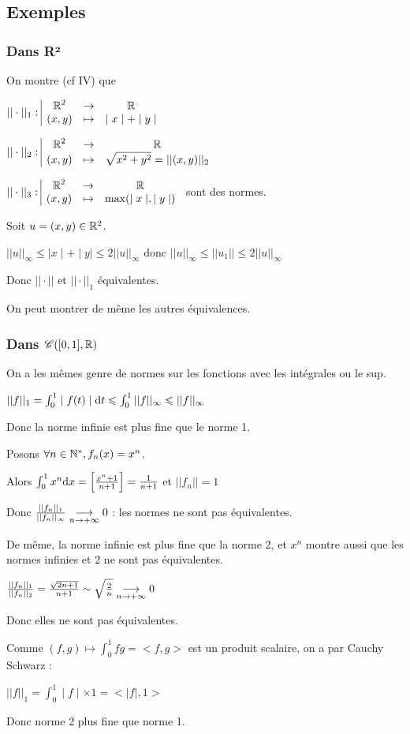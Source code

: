 \subsection{Exemples}

\subsubsection{Dans R²}

\begin{exemple}
    On montre (cf IV) que 

    $|| \cdot ||_1: \space \begin{array}{|ccc} \displaystyle \mathbb{R}^2 & \to & \displaystyle \mathbb{R} \\ \displaystyle (x, y) & \mapsto & \displaystyle \mid x \mid + \mid y \mid \end{array}$

    $|| \cdot ||_2: \space \begin{array}{|ccc} \displaystyle \mathbb{R}^2 & \to & \displaystyle \mathbb{R} \\ \displaystyle (x, y) & \mapsto & \displaystyle \sqrt{x^2 + y^2} = ||(x, y)||_2 \end{array}$

    $|| \cdot ||_3: \space \begin{array}{|ccc} \displaystyle \mathbb{R}^2 & \to & \displaystyle \mathbb{R} \\ \displaystyle (x, y) & \mapsto & \displaystyle \max (\mid x \mid, \mid y \mid) \end{array}$
    sont des normes.

    Soit $u = (x, y) \in \mathbb{R}^2$. 

    $|| u ||_\infty \leqslant \mid x \mid + \mid y \mid \leqslant 2 ||u||_\infty$
    donc $|| u ||_\infty \leqslant ||u_1|| \leqslant 2 ||u||_\infty$

    Donc $|| \cdot ||$ et $|| \cdot ||_1$ équivalentes. 

    On peut montrer de même les autres équivalences.
\end{exemple}

\subsubsection{Dans \texorpdfstring{$\mathscr C([0, 1], \mathbb{R})$}{C([0, 1], R)}}

\begin{exemple}
    On a les mêmes genre de normes sur les fonctions avec les intégrales ou le sup. 

    $|| f ||_1 = \int_{0}^{1} \mid f(t) \mid \text d t \leqslant \int_{0}^{1} ||f||_\infty \leqslant ||f ||_\infty$

    Donc la norme infinie est plus fine que le norme 1. 

    Posons $\forall n \in \mathbb{N}^*, f_n (x) = x^n$. 

    Alors $\int_{0}^{1} x^n \text d x = \left[\frac {x^n + 1}{n+ 1}\right] = \frac 1 {n + 1}$
    et $||f_n|| = 1$

    Donc $\frac{||f_n||_1}{||f_n||_\infty} \underset{n \to + \infty}{\longrightarrow} 0$ : les normes ne sont pas équivalentes. 

    De même, la norme infinie est plus fine que la norme 2, et $x^n$ montre aussi 
    que les normes infinies et 2 ne sont pas équivalentes.

    $\frac{||f_n||_1}{||f_n||_2} = \frac{\sqrt{2n + 1}}{n+1} \sim \sqrt{\frac 2 n} \underset{n \to + \infty}{\longrightarrow} 0$

    Donc elles ne sont pas équivalentes. 

    Comme $(f, g) \mapsto \int_{0}^{1}fg = <f, g>$ est un produit scalaire, on 
    a par Cauchy Schwarz : 

    $||f||_1 = \int_{0}^{1} \mid f \mid \times 1 = <\mid f \mid, 1>$

    Donc norme 2 plus fine que norme 1. 
\end{exemple}

